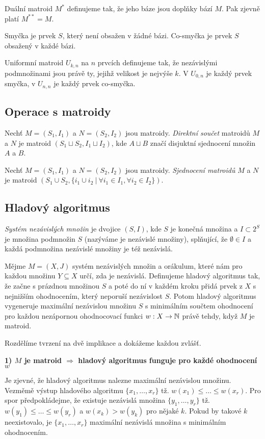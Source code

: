 \df Duální matroid $M^*$ definujeme tak, že jeho báze jsou doplňky bází $M$.
Pak zjevně platí $M^{**} = M$.

\df Smyčka je prvek $S$, který není obsažen v žádné bázi. Co-smyčka je prvek
$S$ obsažený v každé bázi.

\df Uniformní matroid $U_{k,n}$ na $n$ prvcích definujeme tak, že nezávislými
podmnožinami jsou právě ty, jejihž velikost je nejvýše $k$. V $U_{0,n}$ je
každý prvek smyčka, v $U_{n,n}$ je každý prvek co-smyčka.

\subsection{Operace s matroidy}
\df Nechť $M = (S_1,I_1)$ a $N = (S_2,I_2)$ jsou matroidy. \emph{Direktní
součet} matroidů $M$ a $N$ je matroid $(S_1 \sqcup S_2, I_1 \sqcup I_2)$, kde
$A\sqcup B$ značí disjuktní sjednocení množin $A$ a $B$.

\df Nechť $M = (S_1,I_1)$ a $N = (S_2,I_2)$ jsou matroidy. \emph{Sjednocení
matroidů} $M$ a $N$ je matroid $(S_1\cup S_2, \{i_1\cup i_2 ~|~ \forall i_1\in
I_1, \forall i_2\in I_2\})$.

\subsection{Hladový algoritmus}
\df \emph{Systém nezávislých množin} je dvojice $(S,I)$, kde $S$ je konečná
množina a $I \subset 2^S$ je množina podmnožin $S$ (nazýváme je nezávislé
množiny), splňující, že $\emptyset\in I$ a každá podmnožina nezávislé množiny
je též nezávislá.

\vt Mějme $M = (X,J)$ systém nezávislých množin a orákulum, které nám pro každou
množinu $Y\subseteq X$ určí, zda je nezávislá. Definujeme hladový algoritmus
tak, že začne s prázdnou množinou $S$ a poté do ní v každém kroku přidá prvek z
$X$ s nejnižším ohodnocením, který neporuší nezávislost $S$. Potom hladový
algoritmus vygeneruje maximální nezávislou množinu $S$ s minimálním součtem
ohodnocení pro každou nezápornou ohodnocovací funkci $w: X \rightarrow \mathbb{N}$ právě
tehdy, když $M$ je matroid.

\dk Rozdělíme tvrzení na dvě implikace a dokážeme každou zvlášť.

\noindent \textbf{1) $M$ je matroid $\Rightarrow$ hladový algoritmus funguje pro
každé ohodnocení $w$}

Je zjevné, že hladový algoritmus nalezne maximální nezávislou množinu. Vezměmě
výstup hladového algoritmu $\{x_1,\dots,x_r\}$ tž. $w(x_1) \le \dots \le
w(x_r)$. Pro spor předpokládejme, že existuje nezávislá množina
$\{y_1,\dots,y_r\}$ tž. $w(y_1) \le \dots \le w(y_r)$ a $w(x_k) > w(y_k)$
pro nějaké $k$. Pokud by takové $k$ neexistovalo, je $\{x_1,\dots,x_r\}$
maximální nezávislá množina s minimálním ohodnocením.

